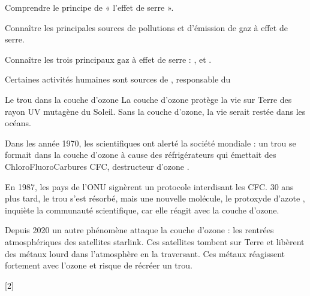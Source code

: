\teteTermStssEnvi
{}

\begin{objectifs}
  \item Comprendre le principe de « l'effet de serre ».
  \item Connaître les principales sources de pollutions et d'émission de gaz à effet de serre.
  \item Connaître les trois principaux gaz à effet de serre : \dioxydeDeCarbone, \methane et \eau.
\end{objectifs}

\begin{contexte}
  Certaines activités humaines sont sources de , responsable du 
  
\end{contexte}

\begin{doc}{Le trou dans la couche d'ozone}
  La couche d'ozone protège la vie sur Terre des rayon UV mutagène du Soleil.
  Sans la couche d'ozone, la vie serait restée dans les océans.

  Dans les année 1970, les scientifiques ont alerté la société mondiale : un trou se formait dans la couche d'ozone à cause des réfrigérateurs qui émettait des ChloroFluoroCarbures CFC, destructeur d'ozone .

  En 1987, les pays de l'ONU signèrent un protocole interdisant les CFC.
  30 ans plus tard, le trou s'est résorbé, mais une nouvelle molécule, le protoxyde d'azote , inquiète la communauté scientifique, car elle réagit avec la couche d'ozone.
  
  Depuis 2020 un autre phénomène attaque la couche d'ozone : les rentrées atmosphériques des satellites starlink.
  Ces satellites tombent sur Terre et libèrent des métaux lourd dans l’atmosphère en la traversant.
  Ces métaux réagissent fortement avec l'ozone et risque de récréer un trou.
\end{doc}

[2]



